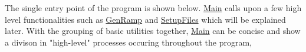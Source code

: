 The single entry point of the program is shown below. \url{Main} calls upon a few high level functionalities such as \url{GenRamp} and \url{SetupFiles} which will be explained later. With the grouping of basic utilities together, \url{Main} can be concise and show a divison in "high-level" processes occuring throughout the program,

